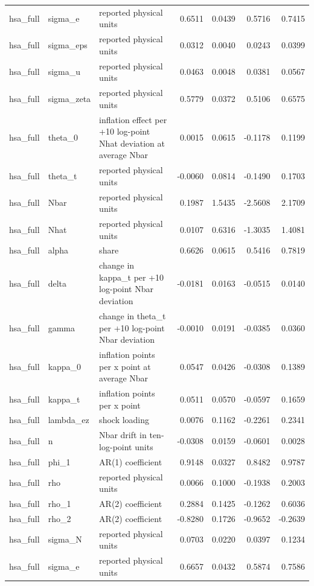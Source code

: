 \begin{tabular}{lllrrrr}
hsa\_full & sigma\_e & reported physical units & 0.6511 & 0.0439 & 0.5716 & 0.7415 \\
hsa\_full & sigma\_eps & reported physical units & 0.0312 & 0.0040 & 0.0243 & 0.0399 \\
hsa\_full & sigma\_u & reported physical units & 0.0463 & 0.0048 & 0.0381 & 0.0567 \\
hsa\_full & sigma\_zeta & reported physical units & 0.5779 & 0.0372 & 0.5106 & 0.6575 \\
hsa\_full & theta\_0 & inflation effect per +10 log-point Nhat deviation at average Nbar & 0.0015 & 0.0615 & -0.1178 & 0.1199 \\
hsa\_full & theta\_t & reported physical units & -0.0060 & 0.0814 & -0.1490 & 0.1703 \\
hsa\_full & Nbar & reported physical units & 0.1987 & 1.5435 & -2.5608 & 2.1709 \\
hsa\_full & Nhat & reported physical units & 0.0107 & 0.6316 & -1.3035 & 1.4081 \\
hsa\_full & alpha & share & 0.6626 & 0.0615 & 0.5416 & 0.7819 \\
hsa\_full & delta & change in kappa\_t per +10 log-point Nbar deviation & -0.0181 & 0.0163 & -0.0515 & 0.0140 \\
hsa\_full & gamma & change in theta\_t per +10 log-point Nbar deviation & -0.0010 & 0.0191 & -0.0385 & 0.0360 \\
hsa\_full & kappa\_0 & inflation points per x point at average Nbar & 0.0547 & 0.0426 & -0.0308 & 0.1389 \\
hsa\_full & kappa\_t & inflation points per x point & 0.0511 & 0.0570 & -0.0597 & 0.1659 \\
hsa\_full & lambda\_ez & shock loading & 0.0076 & 0.1162 & -0.2261 & 0.2341 \\
hsa\_full & n & Nbar drift in ten-log-point units & -0.0308 & 0.0159 & -0.0601 & 0.0028 \\
hsa\_full & phi\_1 & AR(1) coefficient & 0.9148 & 0.0327 & 0.8482 & 0.9787 \\
hsa\_full & rho & reported physical units & 0.0066 & 0.1000 & -0.1938 & 0.2003 \\
hsa\_full & rho\_1 & AR(2) coefficient & 0.2884 & 0.1425 & -0.1262 & 0.6036 \\
hsa\_full & rho\_2 & AR(2) coefficient & -0.8280 & 0.1726 & -0.9652 & -0.2639 \\
hsa\_full & sigma\_N & reported physical units & 0.0703 & 0.0220 & 0.0397 & 0.1234 \\
hsa\_full & sigma\_e & reported physical units & 0.6657 & 0.0432 & 0.5874 & 0.7586 \\

\end{tabular}
